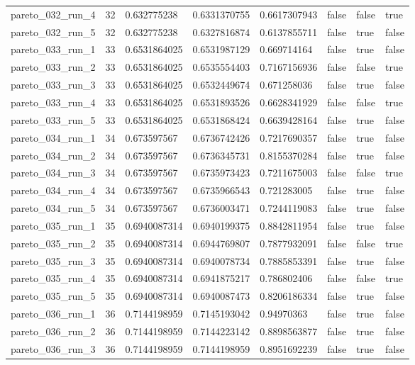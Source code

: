 \begin{tabular}{@{}llllllll@{}}
pareto\_032\_run\_4 & 32 & 0.632775238 & 0.6331370755 & 0.6617307943 & false & false & true \\
pareto\_032\_run\_5 & 32 & 0.632775238 & 0.6327816874 & 0.6137855711 & false & true & false \\
pareto\_033\_run\_1 & 33 & 0.6531864025 & 0.6531987129 & 0.669714164 & false & true & false \\
pareto\_033\_run\_2 & 33 & 0.6531864025 & 0.6535554403 & 0.7167156936 & false & false & true \\
pareto\_033\_run\_3 & 33 & 0.6531864025 & 0.6532449674 & 0.671258036 & false & true & false \\
pareto\_033\_run\_4 & 33 & 0.6531864025 & 0.6531893526 & 0.6628341929 & false & false & true \\
pareto\_033\_run\_5 & 33 & 0.6531864025 & 0.6531868424 & 0.6639428164 & false & true & false \\
pareto\_034\_run\_1 & 34 & 0.673597567 & 0.6736742426 & 0.7217690357 & false & true & false \\
pareto\_034\_run\_2 & 34 & 0.673597567 & 0.6736345731 & 0.8155370284 & false & true & false \\
pareto\_034\_run\_3 & 34 & 0.673597567 & 0.6735973423 & 0.7211675003 & false & false & true \\
pareto\_034\_run\_4 & 34 & 0.673597567 & 0.6735966543 & 0.721283005 & false & true & false \\
pareto\_034\_run\_5 & 34 & 0.673597567 & 0.6736003471 & 0.7244119083 & false & true & false \\
pareto\_035\_run\_1 & 35 & 0.6940087314 & 0.6940199375 & 0.8842811954 & false & true & false \\
pareto\_035\_run\_2 & 35 & 0.6940087314 & 0.6944769807 & 0.7877932091 & false & false & true \\
pareto\_035\_run\_3 & 35 & 0.6940087314 & 0.6940078734 & 0.7885853391 & false & true & false \\
pareto\_035\_run\_4 & 35 & 0.6940087314 & 0.6941875217 & 0.786802406 & false & false & true \\
pareto\_035\_run\_5 & 35 & 0.6940087314 & 0.6940087473 & 0.8206186334 & false & true & false \\
pareto\_036\_run\_1 & 36 & 0.7144198959 & 0.7145193042 & 0.94970363 & false & true & false \\
pareto\_036\_run\_2 & 36 & 0.7144198959 & 0.7144223142 & 0.8898563877 & false & true & false \\
pareto\_036\_run\_3 & 36 & 0.7144198959 & 0.7144198959 & 0.8951692239 & false & true & false \\

\end{tabular}
